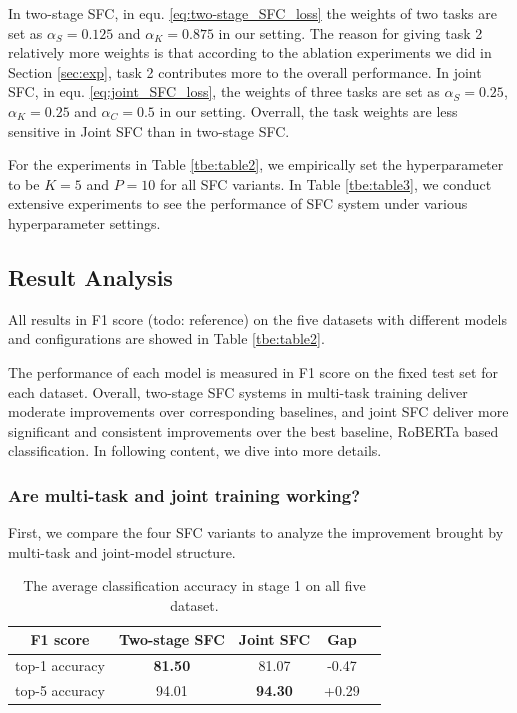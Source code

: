 \documentclass[letterpaper]{article} %
\providecommand{\tabularnewline}{\\}
\begin{document}
  In two-stage SFC, in equ. \ref{eq:two-stage_SFC_loss} the weights of two tasks
  are  set  as  $\alpha_S=0.125$ and $\alpha_K=0.875$ in our setting. The reason
  for  giving  task  2 relatively more weights is that according to the ablation
  experiments  we  did  in Section \ref{sec:exp}, task 2 contributes more to the
  overall  performance.  In  joint  SFC,  in  equ.  \ref{eq:joint_SFC_loss}, the
  weights  of  three  tasks  are  set  as  $\alpha_S=0.25$,  $\alpha_K=0.25$ and
  $\alpha_C=0.5$  in  our setting. Overrall, the task weights are less sensitive
  in Joint SFC than in two-stage SFC.

  For  the  experiments  in  Table  \ref{tbe:table2},  we  empirically  set  the
  hyperparameter  to  be  $K=5$  and  $P=10$  for  all  SFC  variants.  In Table
  \ref{tbe:table3},  we  conduct extensive experiments to see the performance of
  SFC system under various hyperparameter settings.

  \subsection{Result Analysis}
  All results in F1 score (todo: reference) on the five datasets with different models and configurations are
  showed in Table  \ref{tbe:table2}.

  The performance of each model is measured in F1 score on the fixed
  test  set  for  each  dataset.  
  Overall,  two-stage  SFC systems in multi-task training deliver  moderate 
  improvements  over  corresponding baselines, and joint SFC deliver more
  significant and consistent improvements over the best baseline, RoBERTa based
  classification. In following content, we dive into more details.

  \subsubsection*{Are multi-task and joint training working?} 
  First, we compare the four  SFC  variants to analyze the improvement
  brought  by  multi-task  and  joint-model  structure. 

  \begin{table}
    \begin{centering}
      \begin{tabular}{|c|c|c|c|c|}
        \hline
        F1 score & Two-stage SFC & Joint SFC & Gap & \tabularnewline
        \hline
        top-1 accuracy  & \textbf{81.50} & 81.07 & -0.47 & \tabularnewline
        top-5 accuracy & 94.01 & \textbf{94.30} & +0.29 & \tabularnewline
        \hline
      \end{tabular}
      \par
    \end{centering}
    \caption{The average classification accuracy in stage 1 on all five dataset.}
    \label{tbe:top1_5_accuracy}
  \end{table}
\end{document}
